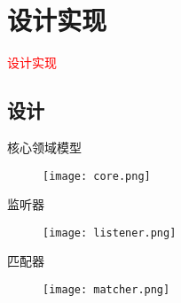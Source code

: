 \section{设计实现}
\label{sec:design}

\begin{frame}
  \begin{center}
    \Huge{\textcolor{red}{设计实现}}
  \end{center}
\end{frame}

\subsection{设计}

\begin{frame}{核心领域模型}
    \centering
    \begin{figure}
      \centering
      \texttt{[image: core.png]}
    \end{figure}
\end{frame}

\begin{frame}{监听器}
    \centering
    \begin{figure}
      \centering
      \texttt{[image: listener.png]}
    \end{figure}
\end{frame}

\begin{frame}{匹配器}
    \centering
    \begin{figure}
      \centering
      \texttt{[image: matcher.png]}
    \end{figure}
\end{frame}
